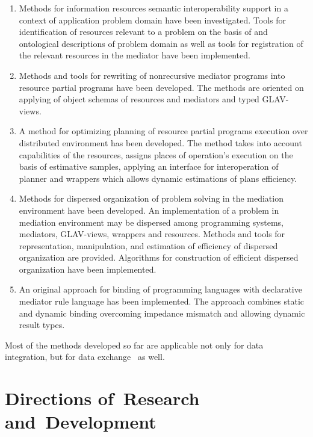 \begin{multicols}{2}

\begin{enumerate}[1.]
\addtocounter{enumi}{2}
\item Methods for information resources semantic interoperability support in a context of 
application problem domain have been investigated. Tools for identification of resources 
relevant to a problem on the basis of and ontological descriptions of problem domain as well as 
tools for registration of the relevant resources in the mediator have been implemented.\\[-9pt]
\item Methods and tools for rewriting of nonrecursive mediator programs into resource 
partial programs have been developed. The methods are oriented on applying of object 
schemas of resources and mediators and typed GLAV-views.\\[-9pt]
\item A method for optimizing planning of resource partial programs execution over 
distributed environment has been developed. The method takes into account capabilities of the 
resources, assigns places of operation's execution on the basis of estimative samples, applying 
an interface for interoperation of planner and wrappers which allows dynamic estimations of 
plans efficiency.\\[-10pt]
\item Methods for dispersed organization of problem solving in the mediation environment 
have been developed. An implementation of a problem in mediation environment may be 
dispersed among programming systems, mediators, GLAV-views, wrappers and resources. 
Methods and tools for representation, manipulation, and estimation of efficiency of dispersed 
organization are provided. Algorithms for construction of efficient dispersed organization have 
been implemented.\\[-10pt]
\item An original approach for binding of programming languages with declarative mediator 
rule language has been implemented. The approach combines static and dynamic binding 
overcoming impedance mismatch and allowing dynamic result types.
\end{enumerate}


Most of the methods developed so far are applicable not only for data integration, but for data 
exchange~\cite{9kal} as well.

\section{Directions of~Research and~Development}


\end{multicols}
